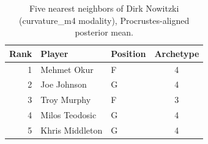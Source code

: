 \begin{table}[htbp]
  \centering\small
  \begin{tabular}{rllc}
    \toprule
    Rank & Player & Position & Archetype \\
    \midrule
    1 & Mehmet Okur & F & 4 \\
    2 & Joe Johnson & G & 4 \\
    3 & Troy Murphy & F & 3 \\
    4 & Milos Teodosic & G & 4 \\
    5 & Khris Middleton & G & 4 \\
    \bottomrule
  \end{tabular}
  \caption{Five nearest neighbors of Dirk Nowitzki (curvature_m4 modality), Procrustes-aligned posterior mean.}
  \label{tab:Dirk_Nowitzki_neighbors_curvature_m4}
\end{table}

